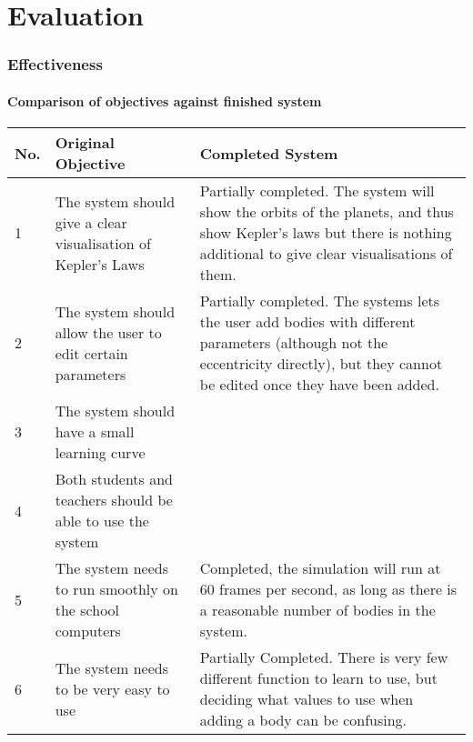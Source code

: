 \part{Evaluation}

%
%
%
%

\section{Effectiveness}
\subsection{Comparison of objectives against finished system}
\begin{tabular}{p{}p{}p{}}
	No. & Original Objective & Completed System \\\hline
	1 & The system should give a clear visualisation of Kepler's Laws &
	Partially completed. The system will show the orbits of the planets, and
	thus show Kepler's laws but there is nothing additional to give clear
	visualisations of them.\\
	2 & The system should allow the user to edit certain parameters &
	Partially completed. The systems lets the user add bodies with different
	parameters (although not the eccentricity directly), but they cannot be
	edited once they have been added. \\
	3 & The system should have a small learning curve & \\
	4 & Both students and teachers should be able to use the system & \\
	5 &The system needs to run smoothly on the school computers & Completed,
	the simulation will run at 60 frames per second, as long as there is a
	reasonable number of bodies in the system.\\
	6 & The system needs to be very easy to use & Partially Completed. There
	is very few different function to learn to use, but deciding what values
	to use when adding a body can be confusing.\\
\end{tabular}

